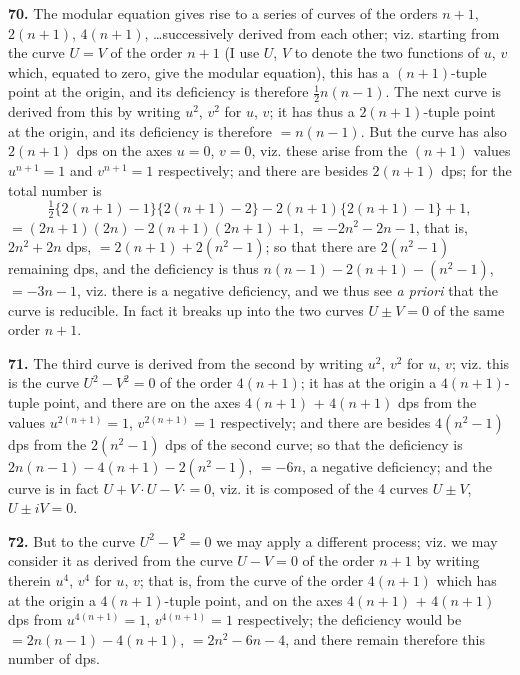 \documentclass[11pt,a4paper]{book}
\begin{document}
\textbf{70.} The modular equation gives rise to a series of curves of the orders $n + 1$, $2(n + 1)$, $4(n + 1)$, \ldots successively derived from each other; viz. starting from the curve $U = V$ of the order $n + 1$ (I use $U$, $V$ to denote the two functions of $u$, $v$ which, equated to zero, give the modular equation), this has a $(n + 1)$-tuple point at the origin, and its deficiency is therefore $\frac{1}{2}n(n - 1)$. The next curve is derived from this by writing $u^2$, $v^2$ for $u$, $v$; it has thus a $2(n + 1)$-tuple point at the origin, and its deficiency is therefore $= n(n - 1)$. But the curve has also $2(n + 1)$ dps on the axes $u = 0$, $v = 0$, viz. these arise from the $(n + 1)$ values $u^{n+1} = 1$ and $v^{n+1} = 1$ respectively; and there are besides $2(n + 1)$ dps; for the total number is
\[
\tfrac{1}{2}\{2(n+1) - 1\}\{2(n+1) - 2\} - 2(n+1)\{2(n+1) - 1\} + 1,
\]
$= (2n + 1)(2n) - 2(n + 1)(2n + 1) + 1$, $= -2n^2 - 2n - 1$, that is, $2n^2 + 2n$ dps, $= 2(n + 1) + 2(n^2 - 1)$; so that there are $2(n^2 - 1)$ remaining dps, and the deficiency is thus $n(n - 1) - 2(n + 1) - (n^2 - 1)$, $= -3n - 1$, viz. there is a negative deficiency, and we thus see \textit{a priori} that the curve is reducible. In fact it breaks up into the two curves $U \pm V = 0$ of the same order $n + 1$.

\textbf{71.} The third curve is derived from the second by writing $u^2$, $v^2$ for $u$, $v$; viz. this is the curve $U^2 - V^2 = 0$ of the order $4(n + 1)$; it has at the origin a $4(n + 1)$-tuple point, and there are on the axes $4(n + 1)$ + $4(n + 1)$ dps from the values $u^{2(n+1)} = 1$, $v^{2(n+1)} = 1$ respectively; and there are besides $4(n^2 - 1)$ dps from the $2(n^2 - 1)$ dps of the second curve; so that the deficiency is $2n(n - 1) - 4(n + 1) - 2(n^2 - 1)$, $= -6n$, a negative deficiency; and the curve is in fact $U + V \cdot U - V \cdot = 0$, viz. it is composed of the 4 curves $U \pm V$, $U \pm iV = 0$.

\textbf{72.} But to the curve $U^2 - V^2 = 0$ we may apply a different process; viz. we may consider it as derived from the curve $U - V = 0$ of the order $n + 1$ by writing therein $u^4$, $v^4$ for $u$, $v$; that is, from the curve of the order $4(n + 1)$ which has at the origin a $4(n + 1)$-tuple point, and on the axes $4(n + 1)$ + $4(n + 1)$ dps from $u^{4(n+1)} = 1$, $v^{4(n+1)} = 1$ respectively; the deficiency would be $= 2n(n - 1) - 4(n + 1)$, $= 2n^2 - 6n - 4$, and there remain therefore this number of dps.
\end{document}
